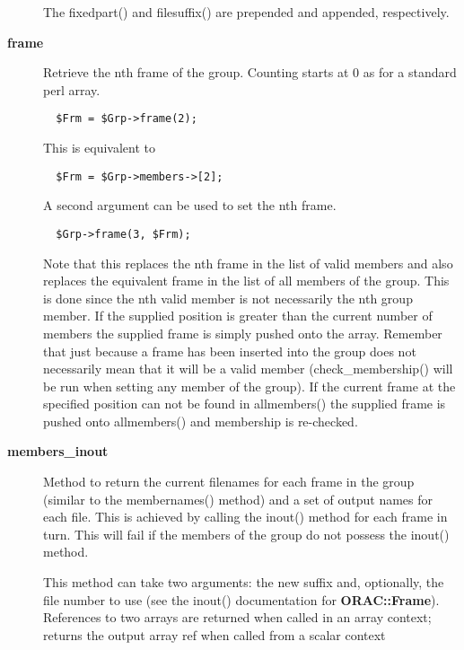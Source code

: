 \begin{description}
The fixedpart() and filesuffix() are prepended and appended,
respectively.


\item[{\textbf{frame}}] \mbox{}

Retrieve the nth frame of the group.
Counting starts at 0 as for a standard perl array.

\begin{verbatim}
  $Frm = $Grp->frame(2);
\end{verbatim}


This is equivalent to

\begin{verbatim}
  $Frm = $Grp->members->[2];
\end{verbatim}


A second argument can be used to set the nth frame.

\begin{verbatim}
  $Grp->frame(3, $Frm);
\end{verbatim}


Note that this replaces the nth frame in the list of valid members and
also replaces the equivalent frame in the list of all members of the
group. This is done since the nth valid member is not necessarily the
nth group member. If the supplied position is greater than the current
number of members the supplied frame is simply pushed onto the
array. Remember that just because a frame has been inserted into the
group does not necessarily mean that it will be a valid member
(check\_membership() will be run when setting any member of the group).
If the current frame at the specified position can not be found in
allmembers() the supplied frame is pushed onto allmembers() and
membership is re-checked.


\item[{\textbf{members\_inout}}] \mbox{}

Method to return the current filenames for each frame in the
group (similar to the membernames() method) and a set of output
names for each file. This is achieved by calling the inout()
method for each frame in turn. This will fail if the members of the
group do not possess the inout() method.



This method can take two arguments: the new suffix and, optionally,
the file number to use (see the inout() documentation for
\textbf{ORAC::Frame}). References to two arrays are returned when called
in an array context; returns the output array ref when called
from a scalar context


\end{description}
